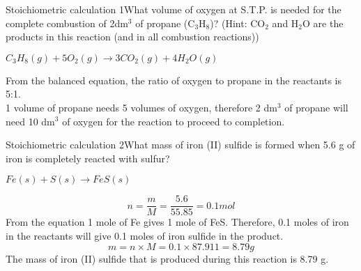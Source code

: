 \begin{wex}{Stoichiometric calculation 1}{What volume of oxygen at S.T.P. is needed for the complete combustion of 2dm$^{3}$ of propane (C$_{3}$H$_{8}$)? (Hint: CO$_{2}$ and H$_{2}$O are the products in this reaction (and in all combustion reactions))\\}

{
\begin{center}
\rm${C_{3}H_{8}(g) + 5O_{2}(g) \rightarrow 3CO_{2}(g) + 4H_{2}O(g)}$\\
\end{center}


From the balanced equation, the ratio of oxygen to propane in the reactants is 5:1. \\

1 volume of propane needs 5 volumes of oxygen, therefore 2 dm$^{3}$ of propane will need 10 dm$^{3}$ of oxygen for the reaction to proceed to completion.}
\end{wex}

\begin{wex}{Stoichiometric calculation 2}{What mass of iron (II) sulfide is formed when 5.6 g of iron is completely reacted with sulfur?\\}
{
\begin{center}
\rm${Fe(s) + S(s) \rightarrow FeS(s)}$
\end{center}

\begin{equation*}
n = \frac{m}{M} = \frac{5.6}{55.85} = 0.1 mol
\end{equation*}
From the equation 1 mole of Fe gives 1 mole of FeS. Therefore, 0.1 moles of iron in the reactants will give 0.1 moles of iron sulfide in the product.\\
\begin{equation*}
m = n \times M = 0.1 \times 87.911 = 8.79 g
\end{equation*}
The mass of iron (II) sulfide that is produced during this reaction is 8.79 g.}
\end{wex}

